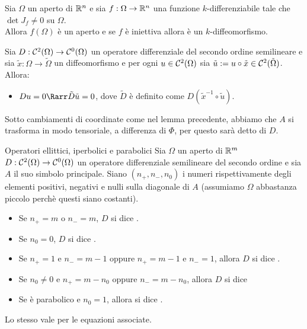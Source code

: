 \documentclass{article}
\begin{document}
\begin{corollary}{}{}
    Sia $\Omega$ un aperto di $\mathbb{R}^n$ e sia $f:\Omega\to\mathbb{R}^n$ una funzione $k$-differenziabile tale che $\det J_f \neq 0$ su $\Omega$.\\
    Allora $f(\Omega)$ è un aperto e se $f$ è iniettiva allora è un $k$-diffeomorfismo.
\end{corollary}

\begin{lemma}{}{}
    Sia $D:\mathcal{C}^2(\Omega)\to\mathcal{C}^0(\Omega)$ un operatore differenziale del secondo ordine semilineare e sia $\tilde{x} : \Omega \to \tilde{\Omega}$ un diffeomorfismo e per ogni $u \in \mathcal{C}^2(\Omega)$ sia $\tilde{u} := u\circ \tilde{x} \in \mathcal{C}^2(\tilde{\Omega})$. Allora:\begin{itemize}
        \item $Du = 0 \Rarr \tilde{D}\tilde{u} = 0$, dove $\tilde{D}$ è definito come $D(\tilde{x}^{-1}\circ \tilde{u})$.
    \end{itemize}
\end{lemma}

\begin{remark}{}{}
    Sotto cambiamenti di coordinate come nel lemma precedente, abbiamo che $A$ si trasforma in modo tensoriale, a differenza di $\Phi$, per questo sarà detto  di $D$.
\end{remark}

\begin{definition}{Operatori ellittici, iperbolici e parabolici}{}
    Sia $\Omega$ un aperto di $\mathbb{R}^m$ $D:\mathcal{C}^2(\Omega)\to\mathcal{C}^0(\Omega)$ un operatore differenziale semilineare del secondo ordine e sia $A$ il suo simbolo principale. Siano $(n_+,n_-,n_0)$ i numeri rispettivamente degli elementi positivi, negativi e nulli sulla diagonale di $A$ (assumiamo $\Omega$ abbastanza piccolo perchè questi siano costanti).\begin{itemize}
        \item Se $n_+ = m$ o $n_- = m$, $D$ si dice .
        \item Se $n_0=0$, $D$ si dice .
        \item Se $n_+ = 1$ e $n_- = m-1$ oppure $n_+ = m-1$ e $n_- = 1$, allora $D$ si dice .
        \item Se $n_0 \neq 0$ e $n_+ = m-n_0$ oppure $n_- = m-n_0$, allora $D$ si dice 
        \item Se è parabolico e $n_0 = 1$, allora si dice .
    \end{itemize}
    Lo stesso vale per le equazioni associate.
\end{definition}
\end{document}
